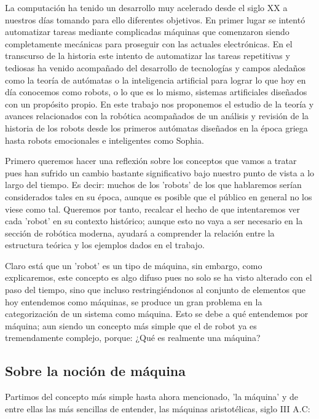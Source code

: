 
La computación ha tenido un desarrollo muy acelerado desde el siglo XX a nuestros días tomando para ello diferentes objetivos. En primer lugar se intentó automatizar tareas mediante complicadas máquinas que comenzaron siendo completamente mecánicas para proseguir con las actuales electrónicas. En el transcurso de la historia este intento de automatizar las tareas repetitivas y tediosas ha venido acompañado del desarrollo de tecnologías y campos aledaños como la teoría de autómatas o la inteligencia artificial para lograr lo que hoy en día conocemos como robots, o lo que es lo mismo, sistemas artificiales diseñados con un propósito propio. En este trabajo nos proponemos el estudio de la teoría y avances relacionados con la robótica acompañados de un análisis y revisión de la historia de los robots desde los primeros autómatas diseñados en la época griega hasta robots emocionales e inteligentes como Sophia.

\vspace{10px}


Primero queremos hacer una reflexión sobre los conceptos que vamos a tratar pues han sufrido un cambio bastante significativo bajo nuestro punto de vista a lo largo del tiempo. Es decir: muchos de los 'robots' de los que hablaremos serían considerados tales en su época, aunque es posible que el público en general no los viese como tal. Queremos por tanto, recalcar el hecho de que intentaremos ver cada 'robot' en su contexto histórico; aunque esto no vaya a ser necesario en la sección de robótica moderna, ayudará a comprender la relación entre la estructura teórica y los ejemplos dados en el trabajo.

\vspace{10px}

Claro está que un 'robot' es un tipo de máquina, sin embargo, como explicaremos, este concepto es algo difuso pues no solo se ha visto alterado con el paso del tiempo, sino que incluso restringiéndonos  al conjunto de elementos que hoy entendemos como máquinas, se produce un gran problema en la categorización de un sistema como máquina. Esto se debe a qué entendemos por máquina; aun siendo un concepto más simple que el de robot ya es tremendamente complejo, porque: ¿Qué es realmente una máquina?

\subsection{Sobre la noción de máquina}


Partimos del concepto más simple hasta ahora mencionado, 'la máquina' y de entre ellas las más sencillas de entender, las máquinas aristotélicas, siglo III A.C: \\


